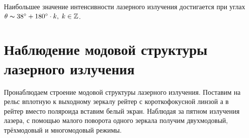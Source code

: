 	Наибольшее значение интенсивности лазерного излучения достигается при углах $\theta \thicksim 38 ^\circ + 180^\circ \cdot k, \; k\in \mathbb{Z}$.

	\newpage

    \section*{Наблюдение модовой структуры лазерного излучения}
    
    Пронаблюдаем строение модовой структуры лазерного излучения. Поставим на рельс вплотную к выходному зеркалу рейтер с короткофокусной линзой а в рейтер вместо поляроида вставим белый экран. Наблюдая за пятном излучения лазера, с помощью малого поворота одного зеркала получим двухмодовый, трёхмодовый и многомодовый режимы.
    
